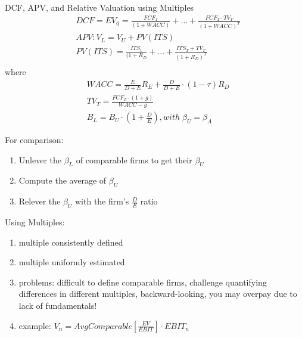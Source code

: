 \documentclass[8pt]{report}
\begin{document}
\begin{multicols*}{2}
DCF, APV, and Relative Valuation using Multiples 
\begin{align*}
	& DCF = EV_0 = \frac{FCF_1}{(1+WACC)} + ... + \frac{FCF_T \cdot TV_T}{(1+WACC)^T} \\
	& APV: V_L = V_U + PV(ITS) \\
	& PV(ITS) = \frac{ITS_1}{(1+R_D} + ... + \frac{ITS_T + TV_T}{(1+R_D)^T} \\
\end{align*} 
where 
\begin{align*}
& WACC = \frac{E}{D+E} R_E + \frac{D}{D+E} \cdot (1-\tau) R_D \\
& TV_T = \frac{FCF_T \cdot (1+g)}{WACC-g} \\
& B_L = B_U \cdot (1+\frac{D}{E}), with \;  \beta_U = \beta_A
\end{align*}

For comparison:
\begin{enumerate}
\item Unlever the $\beta_L$ of comparable firms to get their $\beta_U$
\item Compute the average of $\beta_U$
\item Relever the $\beta_U$ with the firm's $\frac{D}{E}$ ratio
\end{enumerate}

Using Multiples:
\begin{enumerate}
\item multiple consistently defined
\item multiple uniformly estimated 
\item problems: difficult to define comparable firms, challenge quantifying differences in different multiples, backward-looking, you may overpay due to lack of fundamentals! 
\item example: $V_n = AvgComparable[\frac{EV}{EBIT}] \cdot EBIT_n$
\end{enumerate}
\end{multicols*}
\end{document}
